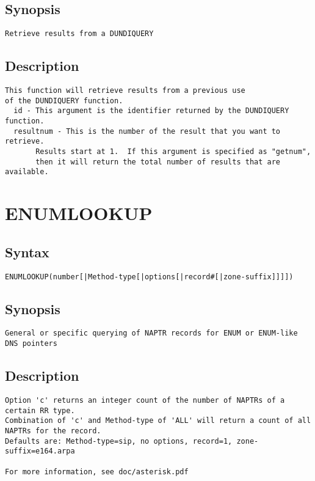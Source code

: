 \subsection{Synopsis}
\begin{verbatim}
Retrieve results from a DUNDIQUERY
\end{verbatim}
\subsection{Description}
\begin{verbatim}
This function will retrieve results from a previous use
of the DUNDIQUERY function.
  id - This argument is the identifier returned by the DUNDIQUERY function.
  resultnum - This is the number of the result that you want to retrieve.
       Results start at 1.  If this argument is specified as "getnum",
       then it will return the total number of results that are available.

\end{verbatim}


\section{ENUMLOOKUP}
\subsection{Syntax}
\begin{verbatim}
ENUMLOOKUP(number[|Method-type[|options[|record#[|zone-suffix]]]])
\end{verbatim}
\subsection{Synopsis}
\begin{verbatim}
General or specific querying of NAPTR records for ENUM or ENUM-like DNS pointers
\end{verbatim}
\subsection{Description}
\begin{verbatim}
Option 'c' returns an integer count of the number of NAPTRs of a certain RR type.
Combination of 'c' and Method-type of 'ALL' will return a count of all NAPTRs for the record.
Defaults are: Method-type=sip, no options, record=1, zone-suffix=e164.arpa

For more information, see doc/asterisk.pdf
\end{verbatim}


